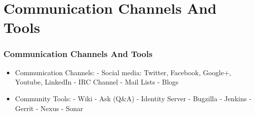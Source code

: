 \section{Communication Channels And Tools}

\begin{frame}
\frametitle{Communication Channels And Tools}

\begin{itemize}
 \item Communication Channels:\linebreak
 - Social media: Twitter, Facebook, Google+, Youtube, LinkedIn\linebreak
 - IRC Channel\linebreak
 - Mail Lists\linebreak
 - Blogs
 \item Community Tools:\linebreak
 - Wiki\linebreak
 - Ask (Q\&A)\linebreak
 - Identity Server\linebreak
 - Bugzilla\linebreak
 - Jenkins\linebreak
 - Gerrit\linebreak
 - Nexus\linebreak
 - Sonar
\end{itemize}

\end{frame}
